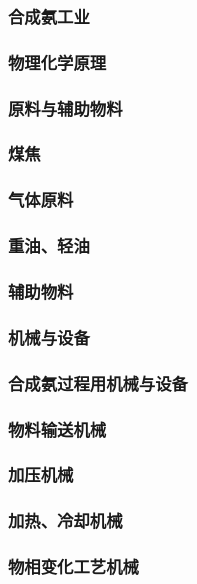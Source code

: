 \documentclass[UTF8]{../../ApplicationUniverse}
\begin{document}
    \subsubsection{合成氨工业}
        \subsubsection{物理化学原理}
        \subsubsection{原料与辅助物料}
            \subsubsection{煤焦}
            \subsubsection{气体原料}
            \subsubsection{重油、轻油}
            \subsubsection{辅助物料}
        \subsubsection{机械与设备}
            \subsubsection{合成氨过程用机械与设备}
                \subsubsection{物料输送机械}
                \subsubsection{加压机械}
                \subsubsection{加热、冷却机械}
                \subsubsection{物相变化工艺机械}
\end{document}
